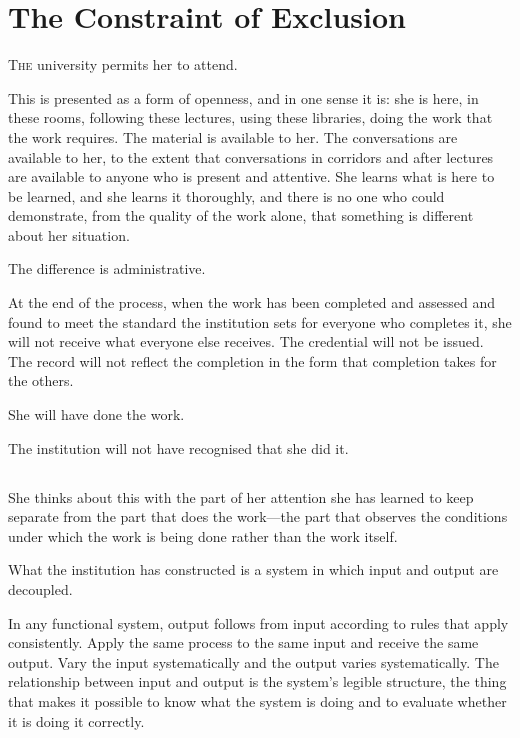 
\chapter{The Constraint of Exclusion}


\lettrine{T}{he} university permits her to attend.

This is presented as a form of openness, and in one
sense it is: she is here, in these rooms, following
these lectures, using these libraries, doing the work
that the work requires. The material is available to
her. The conversations are available to her, to the
extent that conversations in corridors and after
lectures are available to anyone who is present and
attentive. She learns what is here to be learned, and
she learns it thoroughly, and there is no one who
could demonstrate, from the quality of the work alone,
that something is different about her situation.

The difference is administrative.

At the end of the process, when the work has been
completed and assessed and found to meet the standard
the institution sets for everyone who completes it,
she will not receive what everyone else receives. The
credential will not be issued. The record will not
reflect the completion in the form that completion
takes for the others.

She will have done the work.

The institution will not have recognised that she did it.

\section{}

She thinks about this with the part of her attention
she has learned to keep separate from the part that
does the work---the part that observes the conditions
under which the work is being done rather than the
work itself.

What the institution has constructed is a system in
which input and output are decoupled.

In any functional system, output follows from input
according to rules that apply consistently. Apply the
same process to the same input and receive the same
output. Vary the input systematically and the output
varies systematically. The relationship between input
and output is the system's legible structure, the
thing that makes it possible to know what the system
is doing and to evaluate whether it is doing it
correctly.

